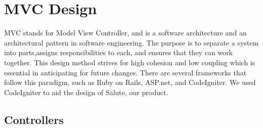 \documentclass[12pt]{report}
\begin{document}
\section{MVC Design}

MVC stands for Model View Controller, and is a software architecture and an architectural pattern in software engineering. The purpose is to separate a system into parts,assigns responsibilities to each, and ensures that they can work together. This design method strives for high cohesion and low coupling which is essential in anticipating for future changes. There are several frameworks that follow this paradigm, such as Ruby on Rails, ASP.net, and CodeIgniter. We used CodeIgniter to aid the design of Salute, our product.  

\subsection{Controllers}
\end{document}
